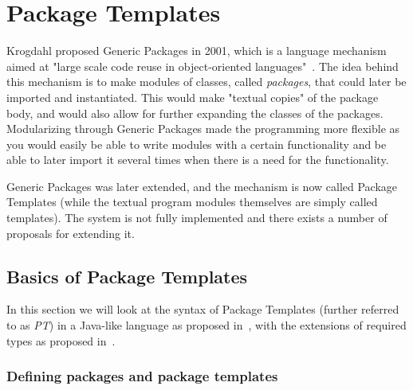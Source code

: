 \section{Package Templates}\label{sec:package-templates}


Krogdahl proposed Generic Packages in 2001, which is a language mechanism aimed at "large scale code reuse in object-oriented languages"~\cite{krogdahl:GP}.
The idea behind this mechanism is to make modules of classes, called \textit{packages}, that could later be imported and instantiated.
This would make "textual copies" of the package body, and would also allow for further expanding the classes of the packages.
Modularizing through Generic Packages made the programming more flexible as you would easily be able to write modules with a certain functionality and be able to later import it several times when there is a need for the functionality.

Generic Packages was later extended, and the mechanism is now called Package Templates (while the textual program modules themselves are simply called templates).
The system is not fully implemented and there exists a number of proposals for extending it.

\subsection{Basics of Package Templates}\label{subsec:basics-of-package-templates}

In this section we will look at the syntax of Package Templates (further referred to as \emph{PT}) in a Java-like language as proposed in~\cite{jot}, with the extensions of required types as proposed in~\cite{requiredtypes}.

\subsubsection{Defining packages and package templates}

